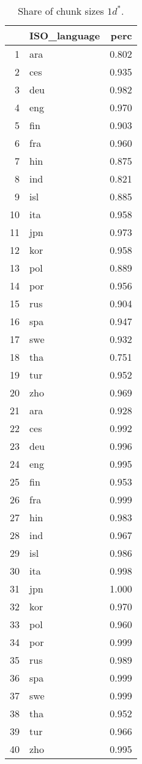 \begin{table}[H]
\centering
\caption{Share of chunk sizes \leq $1d^*$.} 
\begin{tabular}{rlr}
  \hline
 & ISO\_language & perc \\ 
  \hline
1 & ara & 0.802 \\ 
  2 & ces & 0.935 \\ 
  3 & deu & 0.982 \\ 
  4 & eng & 0.970 \\ 
  5 & fin & 0.903 \\ 
  6 & fra & 0.960 \\ 
  7 & hin & 0.875 \\ 
  8 & ind & 0.821 \\ 
  9 & isl & 0.885 \\ 
  10 & ita & 0.958 \\ 
  11 & jpn & 0.973 \\ 
  12 & kor & 0.958 \\ 
  13 & pol & 0.889 \\ 
  14 & por & 0.956 \\ 
  15 & rus & 0.904 \\ 
  16 & spa & 0.947 \\ 
  17 & swe & 0.932 \\ 
  18 & tha & 0.751 \\ 
  19 & tur & 0.952 \\ 
  20 & zho & 0.969 \\ 
  21 & ara & 0.928 \\ 
  22 & ces & 0.992 \\ 
  23 & deu & 0.996 \\ 
  24 & eng & 0.995 \\ 
  25 & fin & 0.953 \\ 
  26 & fra & 0.999 \\ 
  27 & hin & 0.983 \\ 
  28 & ind & 0.967 \\ 
  29 & isl & 0.986 \\ 
  30 & ita & 0.998 \\ 
  31 & jpn & 1.000 \\ 
  32 & kor & 0.970 \\ 
  33 & pol & 0.960 \\ 
  34 & por & 0.999 \\ 
  35 & rus & 0.989 \\ 
  36 & spa & 0.999 \\ 
  37 & swe & 0.999 \\ 
  38 & tha & 0.952 \\ 
  39 & tur & 0.966 \\ 
  40 & zho & 0.995 \\ 
   \hline
\end{tabular}
\end{table}
